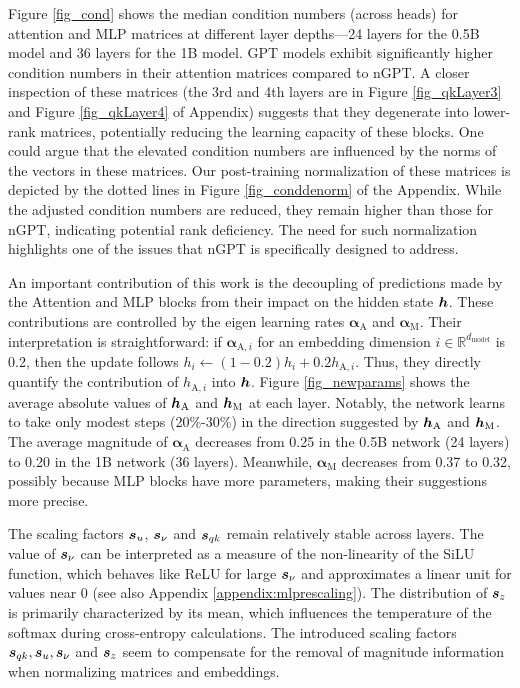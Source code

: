 \documentclass{article} %
\begin{document}
Figure \ref{fig_cond} shows the median condition numbers (across heads) for attention and MLP matrices at different layer depths—24 layers for the 0.5B model and 36 layers for the 1B model. GPT models exhibit significantly higher condition numbers in their attention matrices compared to nGPT.
A closer inspection of these matrices (the 3rd and 4th layers are in Figure \ref{fig_qkLayer3} and Figure \ref{fig_qkLayer4} of Appendix) suggests that they degenerate into lower-rank matrices, potentially reducing the learning capacity of these blocks. One could argue that the elevated condition numbers are influenced by the norms of the vectors in these matrices. Our post-training normalization of  these matrices is depicted by the dotted lines in Figure \ref{fig_conddenorm} of the Appendix. While the adjusted condition numbers are reduced, they remain higher than those for nGPT, indicating potential rank deficiency. The need for such normalization highlights one of the issues that nGPT is specifically designed to address. 


An important contribution of this work is the decoupling of predictions made by the Attention and MLP blocks from their impact on the hidden state  ${\bm{h}}$. These contributions are controlled by the eigen learning rates $\bm{\alpha}_{\text{A}}$ and $\bm{\alpha}_{\text{M}}$. Their interpretation is straightforward: if $\bm{\alpha}_{\text{A},i}$ for an embedding dimension $i\in\mathbb{R}^{d_{\text{model}}}$ is 0.2, then the update follows  $h_i\leftarrow (1-0.2)h_i + 0.2 h_{\text{A},i}$. Thus, they directly quantify the contribution of $h_{\text{A},i}$ into ${\bm{h}}$. Figure \ref{fig_newparams} shows the average absolute values of  ${\bm{h}}_{\text{A}}$ and ${\bm{h}}_{\text{M}}$ at each layer. Notably, the network learns to take only modest steps (20\%-30\%) in the direction suggested by ${\bm{h}}_{\text{A}}$ and ${\bm{h}}_{\text{M}}$. The average magnitude of $\bm{\alpha}_{\text{A}}$ decreases from 0.25 in the 0.5B network (24 layers) to 0.20 in the 1B network (36 layers). Meanwhile, $\bm{\alpha}_{\text{M}}$ decreases from 0.37 to 0.32, possibly because MLP blocks have more parameters, making their suggestions more precise. 

The scaling factors ${\bm{s}}_u$, ${\bm{s}}_{\nu}$ and ${\bm{s}}_{qk}$ remain relatively stable across layers. The value of  ${\bm{s}}_{\nu}$ can be interpreted as a measure of the non-linearity of the SiLU function, which behaves like ReLU for large ${\bm{s}}_{\nu}$ and approximates a linear unit for values near 0 (see also Appendix \ref{appendix:mlprescaling}). The distribution of ${\bm{s}}_z$ is primarily characterized by its mean, which influences the temperature of the softmax during cross-entropy calculations. The introduced scaling factors ${\bm{s}}_{qk},{\bm{s}}_u,{\bm{s}}_{\nu}$ and ${\bm{s}}_z$ seem to compensate for the removal of magnitude information when normalizing matrices and embeddings. 
\end{document}
